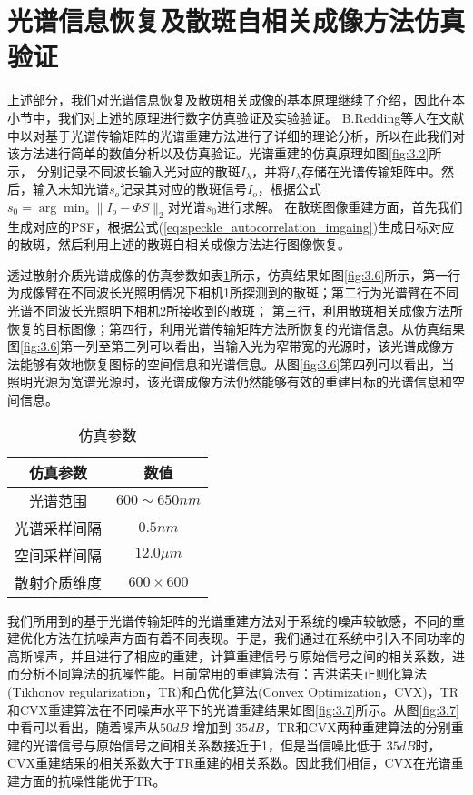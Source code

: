 \section{光谱信息恢复及散斑自相关成像方法仿真验证}\label{光谱传输矩阵章节}
上述部分，我们对光谱信息恢复及散斑相关成像的基本原理继续了介绍，因此在本小节中，我们对上述的原理进行数字仿真验证及实验验证。
B.Redding等人在文献\cite{redding_compact_2013}中以对基于光谱传输矩阵的光谱重建方法进行了详细的理论分析，所以在此我们对该方法进行简单的数值分析以及仿真验证。光谱重建的仿真原理如图\ref{fig:3.2}所示，
分别记录不同波长输入光对应的散斑$I_\lambda$，并将$I_\lambda$存储在光谱传输矩阵中。然后，输入未知光谱$s_{o}$记录其对应的散斑信号$I_{o}$，根据公式$s_{0}=\arg{\min_s \| I_{o} -{\Phi}S \|_2}$对光谱$s_{0}$进行求解。
在散斑图像重建方面，首先我们生成对应的PSF，根据公式(\ref{eq:speckle_autocorrelation_imgaing})生成目标对应的散斑，然后利用上述的散斑自相关成像方法进行图像恢复。

透过散射介质光谱成像的仿真参数如表\ref{table:1.1}所示，仿真结果如图\ref{fig:3.6}所示，第一行为成像臂在不同波长光照明情况下相机1所探测到的散斑；第二行为光谱臂在不同光谱不同波长光照明下相机2所接收到的散斑；
第三行，利用散斑相关成像方法所恢复的目标图像；第四行，利用光谱传输矩阵方法所恢复的光谱信息。从仿真结果图\ref{fig:3.6}第一列至第三列可以看出，当输入光为窄带宽的光源时，该光谱成像方法能够有效地恢复图标的空间信息和光谱信息。从图\ref{fig:3.6}第四列可以看出，当照明光源为宽谱光源时，该光谱成像方法仍然能够有效的重建目标的光谱信息和空间信息。

\begin{table}[htp]
\begin{center}
\caption{仿真参数}
\label{table:1.1}
\begin{tabular}{|c|c|}
\hline
\textbf{仿真参数} & \textbf{数值}\\
\hline
光谱范围 & $600 \sim 650 nm$ \\
\hline
光谱采样间隔 & $0.5  nm$\\
\hline
空间采样间隔 & $12.0 \mu m$ \\
\hline
散射介质维度 & $600 \times 600$ \\
\hline
\end{tabular}
\end{center}
\end{table}

我们所用到的基于光谱传输矩阵的光谱重建方法对于系统的噪声较敏感，不同的重建优化方法在抗噪声方面有着不同表现。于是，我们通过在系统中引入不同功率的高斯噪声，并且进行了相应的重建，计算重建信号与原始信号之间的相关系数，进而分析不同算法的抗噪性能。目前常用的重建算法有：吉洪诺夫正则化算法(Tikhonov regularization，TR)和凸优化算法(Convex Optimization，CVX)，TR和CVX重建算法在不同噪声水平下的光谱重建结果如图\ref{fig:3.7}所示。从图\ref{fig:3.7}中看可以看出，随着噪声从$50 dB$ 增加到 $35 dB$，TR和CVX两种重建算法的分别重建的光谱信号与原始信号之间相关系数接近于1，但是当信噪比低于 $35 dB$时，CVX重建结果的相关系数大于TR重建的相关系数。因此我们相信，CVX在光谱重建方面的抗噪性能优于TR。


